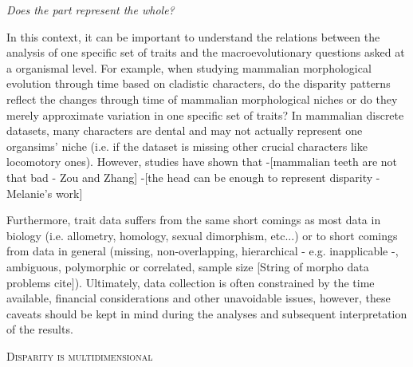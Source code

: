 \documentclass[12pt,letterpaper]{article}
\renewcommand{\section}[1]{%
\bigskip
\begin{center}
\begin{Large}
\normalfont\scshape #1
\medskip
\end{Large}
\end{center}}
\renewcommand{\subsection}[1]{%
\bigskip
\begin{center}
\begin{large}
\normalfont\itshape #1
\end{large}
\end{center}}
\begin{document}
\subsection{Does the part represent the whole?}

In this context, it can be important to understand the relations between the analysis of one specific set of traits and the macroevolutionary questions asked at a organismal level.
For example, when studying mammalian morphological evolution through time based on cladistic characters, do the disparity patterns reflect the changes through time of mammalian morphological niches or do they merely approximate variation in one specific set of traits?
In mammalian discrete datasets, many characters are dental and may not actually represent one organsims' niche (i.e. if the dataset is missing other crucial characters like locomotory ones). %
However, studies have shown that
-[mammalian teeth are not that bad - Zou and Zhang] 
-[the head can be enough to represent disparity - Melanie's work]

Furthermore, trait data suffers from the same short comings as most data in biology (i.e. allometry, homology, sexual dimorphism, etc...) or to short comings from data in general (missing, non-overlapping, hierarchical - e.g. inapplicable -, ambiguous, polymorphic or correlated, sample size [String of morpho data problems cite]).
Ultimately, data collection is often constrained by the time available, financial considerations and other unavoidable issues, however, these caveats should be kept in mind during the analyses and subsequent interpretation of the results.

\section{Disparity is multidimensional}
\end{document}
